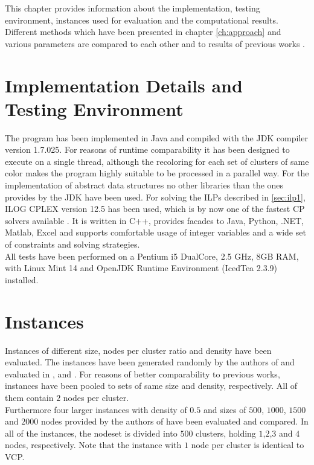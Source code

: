 This chapter provides information about the implementation, testing environment, instances used for evaluation and the computational results. Different methods which have been presented in chapter \ref{ch:approach} and various parameters are compared to each other and to results of previous works \cite{li-00, noronha-06, frota-07}. 

\section{Implementation Details and Testing Environment}
The program has been implemented in Java and compiled with the JDK compiler version 1.7.025. For reasons of runtime comparability it has been designed to execute on a single thread, although the recoloring for each set of clusters of same color makes the program highly suitable to be processed in a parallel way. For the implementation of abstract data structures no other libraries than the ones provides by the JDK have been used. For solving the ILPs described in \ref{sec:ilp1}, ILOG CPLEX version 12.5 has been used, which is by now one of the fastest CP solvers available \cite{Meindl-12}. It is written in C++, provides facades to Java, Python, .NET, Matlab, Excel and supports comfortable usage of integer variables and a wide set of constraints and solving strategies.\\
All tests have been performed on a Pentium i5 DualCore, 2.5 GHz, 8GB RAM, with Linux Mint 14 and OpenJDK Runtime Environment (IcedTea 2.3.9) installed.

\section{Instances}
Instances of different size, nodes per cluster ratio and density have been evaluated. The instances have been generated randomly by the authors of \cite{frota-07} and evaluated in \cite{frota-07}, \cite{pop-13} and \cite{volko-13}. For reasons of better comparability to previous works, instances have been pooled to sets of same size and density, respectively. All of them contain $2$ nodes per cluster.\\ 
Furthermore four larger instances with density of $0.5$ and sizes of $500$, $1000$, $1500$ and $2000$ nodes provided by the authors of \cite{noronha-06} have been evaluated and compared. In all of the instances, the nodeset is divided into $500$ clusters, holding $1$,$2$,$3$ and $4$ nodes, respectively. Note that the instance with $1$ node per cluster is identical to VCP. 


